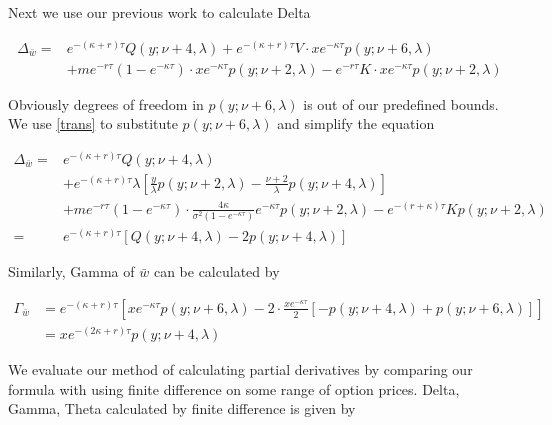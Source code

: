 Next we use our previous work to calculate Delta

\begin{equation}
    \begin{aligned}
        \Delta_{\bar{w}}=&  e^{ -(\kappa+r) \tau} Q(y ; \nu+4, \lambda) + e^{ -(\kappa+r) \tau}V \cdot x e^{-\kappa \tau} p(y ; \nu+6, \lambda)\\
        &+ m e^{-r \tau}(1-e^{-\kappa \tau}) \cdot x e^{-\kappa \tau} p(y ; \nu+2, \lambda) -e^{-r \tau} K \cdot x e^{-\kappa \tau} p(y ; \nu+2, \lambda)
        \end{aligned}
\end{equation}

\noindent Obviously degrees of freedom in $p(y;\nu+6,\lambda)$ is out of our predefined bounds. We use \eqref{trans} to substitute $p(y;\nu+6,\lambda)$ and simplify the equation

\begin{equation}\label{delta}
    \begin{aligned}
        \Delta_{\bar{w}}=&  e^{ -(\kappa+r) \tau} Q(y ; \nu+4, \lambda) \\
        &+ e^{ -(\kappa+r) \tau} \lambda \left[\frac{y}{\lambda} p(y ; \nu+2, \lambda)-\frac{\nu+2}{\lambda} p(y ; \nu+4, \lambda)\right]\\
        &+ m e^{-r \tau}(1-e^{-\kappa \tau}) \cdot \frac{4 \kappa}{\sigma^{2}(1-e^{-\kappa \tau})} e^{-\kappa \tau} p(y ; \nu+2, \lambda) -e^{-(r+\kappa) \tau} K  p(y ; \nu+2, \lambda) \\
        =& e^{ -(\kappa+r) \tau} [Q(y; \nu+4, \lambda)-2p(y ; \nu+4, \lambda)] 
        \end{aligned}
\end{equation}

Similarly, Gamma of $\bar{w}$ can be calculated by

\begin{equation}\label{gamma}
    \begin{aligned}
        \Gamma_{\bar{w}}&= e^{ -(\kappa+r) \tau} \left[x e^{-\kappa \tau} p(y ; \nu+6, \lambda)-2 \cdot \frac{x e^{-\kappa \tau}}{2} [-p(y ; \nu+4, \lambda)+p(y ; \nu+6, \lambda)]\right] \\
        &= xe^{ -(2\kappa+r) \tau}p(y;\nu+4,\lambda)
    \end{aligned}
\end{equation}

We evaluate our method of calculating partial derivatives by comparing our formula with using finite difference on some range of option prices. Delta, Gamma, Theta calculated by finite difference is given by

